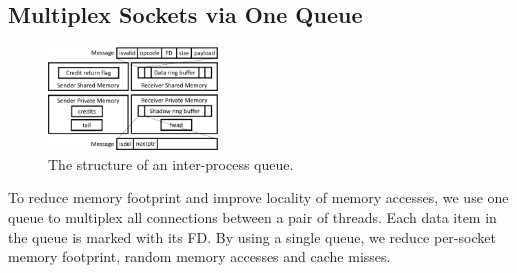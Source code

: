 


\iffalse
\subsection{Multiplex Sockets via One Queue}
\label{subsec:multiplex-conn}

\begin{figure}[t]
	\centering
	\includegraphics[width=0.4\textwidth]{images/locklessq_new}
	\vspace{-5pt}
	\caption{The structure of an inter-process queue.}
	\vspace{-15pt}
	\label{fig:locklessq-structure}
\end{figure}


To reduce memory footprint and improve locality of memory accesses, we use one queue to multiplex all connections between a pair of threads. Each data item in the queue is marked with its FD. By using a single queue, we reduce per-socket memory footprint, random memory accesses and cache misses.

